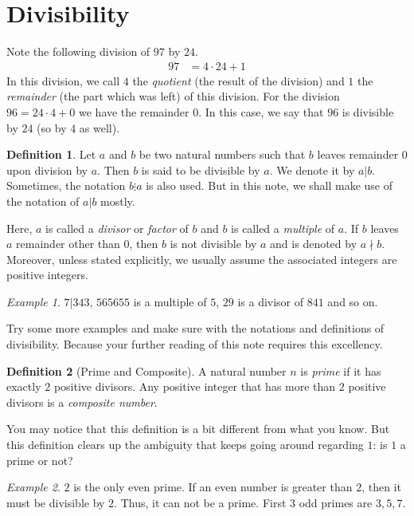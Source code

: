 \documentclass[a4paper, 12pt, leqno]{article}
\theoremstyle{definition}
\newtheorem{definition}{Definition}
\theoremstyle{remark}
\newtheorem*{example}{Example}
\begin{document}
	\section{Divisibility}
		Note the following division of $97$ by $24$.
			\begin{align*}
				97 & = 4\cdot24+1
			\end{align*}
		In this division, we call $4$ the \textit{quotient} (the result of the division) and $1$ the \textit{remainder} (the part which was left) of this division. For the division $96 = 24 · 4 + 0$ we have the remainder $0$. In this case, we say that $96$ is divisible by $24$ (so by $4$ as well).
			\begin{definition}
				Let $a$ and $b$ be two natural numbers such that $b$ leaves remainder $0$ upon division by $a$. Then $b$ is said to be divisible by $a$. We denote it by $a|b$. Sometimes, the notation $b\vdots a$ is also used. But in this note, we shall make use of the notation of $a|b$ mostly.
				
				Here, $a$ is called a \textit{divisor} or \textit{factor} of $b$ and $b$ is called a \textit{multiple} of $a$. If $b$ leaves $a$ remainder other than $0$, then $b$ is not divisible by $a$ and is denoted by $a\nmid b$. Moreover, unless stated explicitly, we usually assume the associated integers are positive integers.
			\end{definition}
			
			\begin{example}
				$7|343$, $565655$ is a multiple of $5$, $29$ is a divisor of $841$ and so on.
			\end{example}
		Try some more examples and make sure with the notations and definitions of divisibility. Because your further reading of this note requires this excellency.
			\begin{definition}[Prime and Composite]
				A natural number $n$ is \textit{prime} if it has exactly $2$ positive divisors. Any positive integer that has more than $2$ positive divisors is a \textit{composite number}.
			\end{definition}
		You may notice that this definition is a bit different from what you know. But this definition clears up the ambiguity that keeps going around regarding $1$: is $1$ a prime or not?
			\begin{example}
				$2$ is the only even prime. If an even number is greater than $2$, then it must be divisible by $2$. Thus, it can not be a prime. First $3$ odd primes are $3, 5, 7$.
			\end{example}
\end{document}
